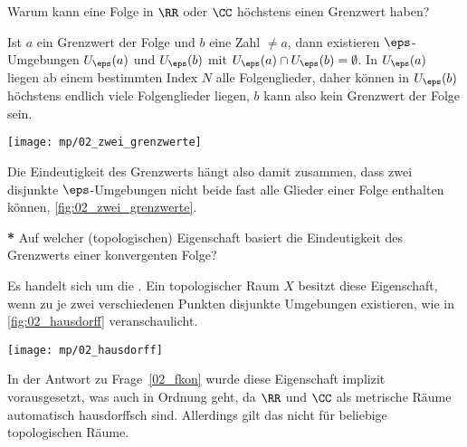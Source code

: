 \begin{frage}%
  \label{02_fkon}
  Warum kann eine Folge in $\RR$ oder $\CC$ höchstens einen Grenzwert haben?
\end{frage}

\begin{antwort}
  Ist $a$ ein Grenzwert der Folge und $b$ eine Zahl $\not=a$, dann existieren 
  $\eps$-Umgebungen $U_\eps(a)$ und $U_\eps(b)$ mit 
  $U_\eps(a)\cap U_\eps(b)=\emptyset$. 
  In $U_\eps(a)$ liegen ab einem bestimmten 
  Index $N$ alle Folgenglieder, daher können in $U_\eps(b)$ höchstens endlich 
  viele Folgenglieder liegen, $b$ kann also kein Grenzwert der Folge sein. 

  \begin{center}
    \texttt{[image: mp/02\_zwei\_grenzwerte]}
    \label{fig:02_zwei_grenzwerte}
  \end{center}

  Die Eindeutigkeit des Grenzwerts hängt also damit zusammen, 
  dass zwei disjunkte $\eps$-Umgebungen nicht beide fast alle 
  Glieder einer Folge enthalten können, 
  \sieheAbbildung\ref{fig:02_zwei_grenzwerte}.
  \AntEnd
\end{antwort}


\begin{frage}\label{01_hausdorff}
  \hspace*{-2mm}\textbf{*} Auf welcher (topologischen) 
  Eigenschaft basiert die Eindeutigkeit 
  des Grenzwerts einer konvergenten Folge?
\end{frage}

\begin{antwort}
  Es handelt sich um die . 
  Ein topologischer Raum $X$ besitzt diese Eigenschaft, wenn zu je zwei 
  verschiedenen Punkten disjunkte Umgebungen existieren, wie in 
  \Abb\ref{fig:02_hausdorff} veranschaulicht.  
  
  \begin{center}
    \texttt{[image: mp/02\_hausdorff]}
    \label{fig:02_hausdorff}
  \end{center}
  In der Antwort zu Frage~\ref{02_fkon} wurde diese Eigenschaft implizit 
  vorausgesetzt, was auch in Ordnung geht, da $\RR$ und $\CC$ als 
  metrische Räume automatisch hausdorffsch sind.  
  Allerdings gilt das nicht für beliebige topologischen Räume. 
  \AntEnd
\end{antwort}

